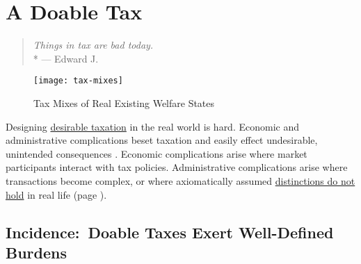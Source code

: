 
\chapter[Doable Tax]{A Doable Tax}\label{chap:doable-tax}



\begin{quote}
	\emph{Things in tax are bad today.}\\*%
	--- Edward J.\ \citet[893]{McCaffery2005}
\end{quote}


 \begin{figure}[htbp]
	\centering
	\texttt{[image: tax-mixes]}
	\caption[Tax Mixes]{Tax Mixes of Real Existing Welfare States}
	\label{fig:tax-mixes}
\end{figure}


Designing \hyperref[sec:Desirability]{desirable taxation} in the real world is hard.
Economic and administrative complications beset taxation and easily effect undesirable, unintended consequences \citep{Merton-1968-aa}.
Economic complications arise where market participants interact with tax policies.
Administrative complications arise where transactions become complex, or where axiomatically assumed \hyperref[sec:WorkPlay]{distinctions do not hold} in real life (page \pageref{sec:WorkPlay}).

\section[Incidence]{Incidence:~Doable Taxes Exert Well-Defined Burdens} \label{sec:tax-incidence}


